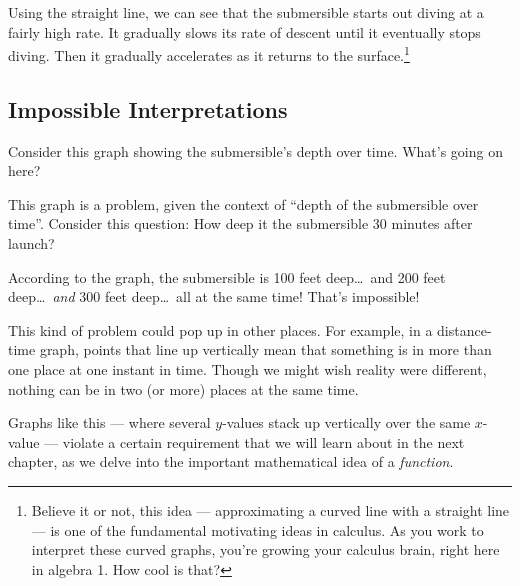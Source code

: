 Using the straight line, we can see that the submersible starts out diving at a fairly high rate. It gradually slows its rate of descent until it eventually stops diving. Then it gradually accelerates as it returns to the surface.\footnote{Believe it or not, this idea --- approximating a curved line with a straight line --- is one of the fundamental motivating ideas in calculus. As you work to interpret these curved graphs, you're growing your calculus brain, right here in algebra 1. How cool is that?}

\subsection{Impossible Interpretations}

Consider this graph showing the submersible's depth over time. What's going on here?

\begin{center}
\end{center}

This graph is a problem, given the context of ``depth of the submersible over time''. Consider this question: How deep it the submersible 30 minutes after launch?

According to the graph, the submersible is 100 feet deep\ldots\ and 200 feet deep\ldots\ \textit{and} 300 feet deep\ldots\ all at the same time! That's impossible!

This kind of problem could pop up in other places. For example, in a distance-time graph, points that line up vertically mean that something is in more than one place at one instant in time. Though we might wish reality were different, nothing can be in two (or more) places at the same time.

Graphs like this --- where several $y$-values stack up vertically over the same $x$-value --- violate a certain requirement that we will learn about in the next chapter, as we delve into the important mathematical idea of a \textit{function}.
